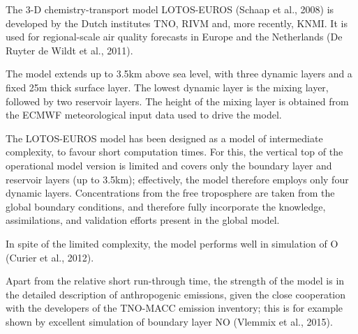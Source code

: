 \documentclass[9pt]{report}
\begin{document}
\noindent{}The 3-D chemistry-transport model LOTOS-EUROS (Schaap et al., 2008) is developed by the Dutch institutes TNO, RIVM and, more recently, KNMI.
It is used for regional-scale air quality forecasts in Europe and the Netherlands (De Ruyter de Wildt et al., 2011).%

The model extends up to 3.5km above sea level, with three dynamic layers and a ﬁxed 25m thick surface layer. 
The lowest dynamic layer is the mixing layer, followed by two reservoir layers. 
The height of the mixing layer is obtained from the ECMWF meteorological input data used to drive the model.%

The LOTOS-EUROS model has been designed as a model of intermediate complexity, to favour short computation times. 
For this, the vertical top of the operational model version is limited and covers only the boundary layer and reservoir layers (up to 3.5km); effectively, the model therefore employs only four dynamic layers. 
Concentrations from the free troposphere are taken from the global boundary conditions, and therefore fully incorporate the knowledge, assimilations, and validation efforts present in the global model.%

In spite of the limited complexity, the model performs well in simulation of O (Curier et al., 2012).%

Apart from the relative short run-through time, the strength of the model is in the detailed description of anthropogenic emissions, given the close cooperation with the developers of the TNO-MACC emission inventory; this is for example shown by excellent simulation of boundary layer NO (Vlemmix et al., 2015).%
\end{document}
